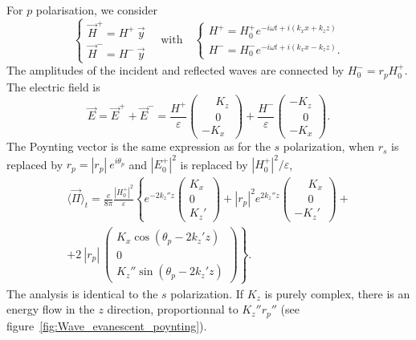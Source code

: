 For $p$ polarisation, we consider 
$$
\left\{
\begin{array}{l}
\vec H^+ = H^+\ \vec y \\
\vec H^- = H^-\ \vec y
\end{array}
\right.
\quad\mathrm{with}\quad
\left\{
\begin{array}{l}
H^+ = H_0^+ e^{-i\omega t + i(k_x x + k_z z)}  \\
H^- = H_0^- e^{-i\omega t + i(k_x x - k_z z)}.
\end{array}
\right.
$$
The amplitudes of the incident and reflected waves are connected by $H_0^- = r_p H_0^+$.
The electric field is
$$
\vec E = \vec E^+ + \vec E^- = 
\frac{H^+}{\varepsilon}
\begin{pmatrix}
\phantom{-} K_z \\
\phantom{-} 0 \\
- K_x 
\end{pmatrix}
+
\frac{H^-}{\varepsilon}
\begin{pmatrix}
- K_z \\
\phantom{-} 0 \\
- K_x 
\end{pmatrix}.
$$
The Poynting vector is the same expression as for the $s$ polarization, when $r_s$ is replaced by $r_p = |r_p|\ e^{i\theta_{p}}$ and $|E_0^+|^2$ is replaced by $|H_0^+|^2/\varepsilon$,
\begin{align*}
\langle \vec{\Pi} \rangle_t = 
\frac{c}{8\pi} \frac{|H_0^+|^2}{\varepsilon} \left\{
e^{-2 k_z'' z} 
\begin{pmatrix}
K_x \\
0 \\
K_z'
\end{pmatrix}
+ 
|r_p|^2
e^{2 k_z'' z}
\begin{pmatrix}
\phantom{-} K_x \\
\phantom{-} 0 \\
-K_z'
\end{pmatrix}
+ \right.\\
\left. +
2\ |r_p|\ 
\begin{pmatrix}
K_x \cos(\theta_{p} - 2 k_z' z)\\
0 \\
K_z'' \sin(\theta_{p} - 2 k_z' z)
\end{pmatrix}
\right\}.
\end{align*}
The analysis is identical to the $s$ polarization. 
If $K_z$ is purely complex, there is an energy flow in the $z$ direction, proportionnal to $K_z'' r_p''$ (see figure~\ref{fig:Wave_evanescent_poynting}).

